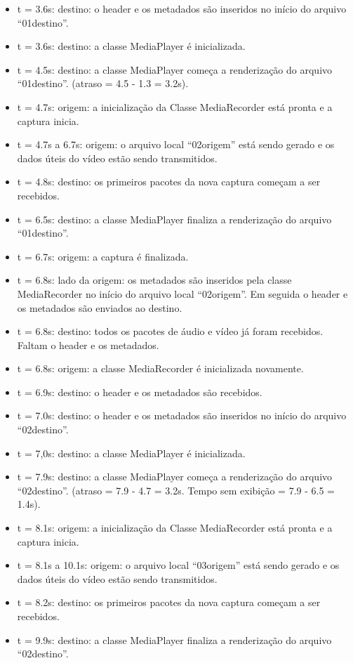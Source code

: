 \documentclass{acm_proc_article-sp}
\begin{document}
\begin{itemize}
 \item t = 3.6s: destino: o header e os metadados são inseridos no início do arquivo “01destino”.
 \item t = 3.6s: destino: a classe MediaPlayer é inicializada.
 \item t = 4.5s: destino: a classe MediaPlayer começa a renderização do arquivo “01destino”. (atraso = 4.5 - 1.3 = 3.2s).
 \item t = 4.7s: origem: a inicialização da Classe MediaRecorder está pronta e a captura inicia.
 \item t = 4.7s a 6.7s: origem: o arquivo local “02origem” está sendo gerado e os dados úteis do vídeo estão sendo transmitidos.
 \item t = 4.8s: destino: os primeiros pacotes da nova captura começam a ser recebidos.
 \item t = 6.5s: destino: a classe MediaPlayer finaliza a renderização do arquivo “01destino”.
 \item t = 6.7s: origem: a captura é finalizada.
 \item t = 6.8s: lado da origem: os metadados são inseridos pela classe MediaRecorder no início do arquivo local “02origem”. Em seguida o header e os metadados são enviados ao destino.
 \item t = 6.8s: destino: todos os pacotes de áudio e vídeo já foram recebidos. Faltam o header e os metadados.
 \item t = 6.8s: origem: a classe MediaRecorder é inicializada novamente.
 \item t = 6.9s: destino: o header e os metadados são recebidos.
 \item t = 7.0s: destino: o header e os metadados são inseridos no início do arquivo “02destino”.
 \item t = 7,0s: destino: a classe MediaPlayer é inicializada.
 \item t = 7.9s: destino: a classe MediaPlayer começa a renderização do arquivo “02destino”. (atraso = 7.9 - 4.7 = 3.2s. Tempo sem exibição = 7.9 - 6.5 = 1.4s).
 \item t = 8.1s: origem: a inicialização da Classe MediaRecorder está pronta e a captura inicia.
 \item t = 8.1s a 10.1s: origem: o arquivo local “03origem” está sendo gerado e os dados úteis do vídeo estão sendo transmitidos.
 \item t = 8.2s: destino: os primeiros pacotes da nova captura começam a ser recebidos.
 \item t = 9.9s: destino: a classe MediaPlayer finaliza a renderização do arquivo “02destino”.

\end{itemize}
\end{document}
